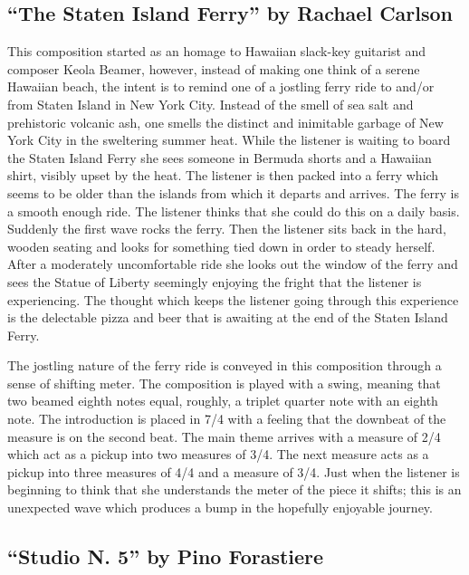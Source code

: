 \documentclass{tufte-handout}
\begin{document}
\subsection*{``The Staten Island Ferry'' by Rachael Carlson}
This composition started as an homage to Hawaiian slack-key guitarist and composer Keola Beamer, however, instead of making one think of a serene Hawaiian beach, the intent is to remind one of a jostling ferry ride to and/or from Staten Island in New York City. Instead of the smell of sea salt and prehistoric volcanic ash, one smells the distinct and inimitable garbage of New York City in the sweltering summer heat. While the listener is waiting to board the Staten Island Ferry she sees someone in Bermuda shorts and a Hawaiian shirt, visibly upset by the heat. The listener is then packed into a ferry which seems to be older than the islands from which it departs and arrives. The ferry is a smooth enough ride. The listener thinks that she could do this on a daily basis. Suddenly the first wave rocks the ferry. Then the listener sits back in the hard, wooden seating and looks for something tied down in order to steady herself. After a moderately uncomfortable ride she looks out the window of the ferry and sees the Statue of Liberty seemingly enjoying the fright that the listener is experiencing. The thought which keeps the listener going through this experience is the delectable pizza and beer that is awaiting at the end of the Staten Island Ferry.

The jostling nature of the ferry ride is conveyed in this composition through
a sense of shifting meter. The composition is played with a swing, meaning
that two beamed eighth notes equal, roughly, a triplet quarter note with an
eighth note. The introduction is placed in 7/4 with a feeling that the
downbeat of the measure is on the second beat. The main theme arrives with a
measure of 2/4 which act as a pickup into two measures of 3/4. The next
measure acts as a pickup into three measures of 4/4 and a measure of 3/4. Just
when the listener is beginning to think that she understands the meter of the
piece it shifts; this is an unexpected wave which produces a bump in the
hopefully enjoyable journey.

\subsection*{``Studio N. 5'' by Pino Forastiere}
\end{document}
